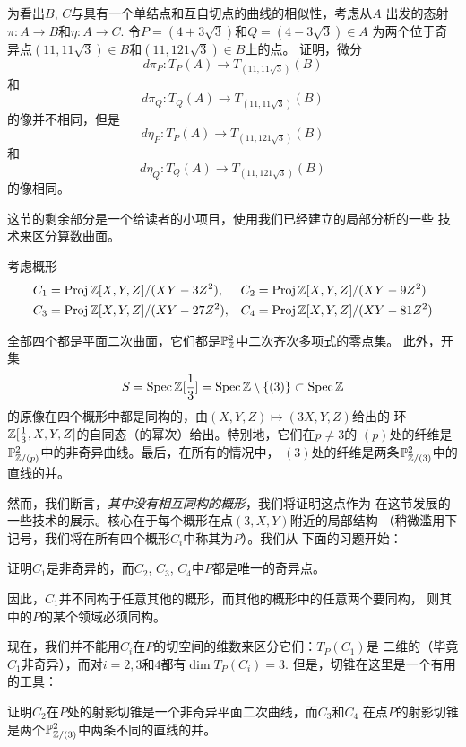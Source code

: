 \begin{exe}\label{exe:4.53}
为看出$B$, $C$与具有一个单结点和互自切点的曲线的相似性，考虑从$A$
出发的态射$\pi:A\to B$和$\eta:A\to C$. 令$P=(4+3\sqrt 3)$和$Q=(4-3\sqrt 3)\in A$
为两个位于奇异点$(11,11\sqrt 3)\in B$和$(11,121\sqrt 3)\in B$上的点。
证明，微分
\[
	d\pi_P:T_P(A)\longrightarrow T_{(11,11\sqrt 3)}(B)
\]
和
\[
	d\pi_Q:T_Q(A)\longrightarrow T_{(11,11\sqrt 3)}(B)
\]
的像并不相同，但是
\[
	d\eta_P:T_P(A)\longrightarrow T_{(11,121\sqrt 3)}(B)
\]
和
\[
	d\eta_Q:T_Q(A)\longrightarrow T_{(11,121\sqrt 3)}(B)
\]
的像相同。
\end{exe}


这节的剩余部分是一个给读者的小项目，使用我们已经建立的局部分析的一些
技术来区分算数曲面。

\begin{exa}\label{exa:4.54}
考虑概形
\[
	\begin{aligned}
		&C_1=\operatorname{Proj} \mathbb{Z}[X,Y,Z]/(XY-3Z^2),&&C_2=\operatorname{Proj} \mathbb{Z}[X,Y,Z]/(XY-9Z^2)\\
		&C_3=\operatorname{Proj} \mathbb{Z}[X,Y,Z]/(XY-27Z^2),&&C_4=\operatorname{Proj} \mathbb{Z}[X,Y,Z]/(XY-81Z^2)
	\end{aligned}
\]

全部四个都是平面二次曲面，它们都是$\mathbb{P}_{\mathbb{Z}}^2$中二次齐次多项式的零点集。
此外，开集
\[
	S=\operatorname{Spec} \mathbb{Z}[\frac 13]=\operatorname{Spec} \mathbb{Z}\setminus\{(3)\}\subset \operatorname{Spec} \mathbb{Z}
\]
的原像在四个概形中都是同构的，由$(X,Y,Z)\mapsto (3X,Y,Z)$给出的
环$\mathbb{Z}[\frac 13,X,Y,Z]$的自同态（的幂次）给出。特别地，它们在$p\neq 3$的
$(p)$处的纤维是$\mathbb{P}_{\mathbb{Z}/(p)}^2$中的非奇异曲线。最后，在所有的情况中，
$(3)$处的纤维是两条$\mathbb{P}_{\mathbb{Z}/(3)}^2$中的直线的并。
\end{exa}

然而，我们断言，\emph{其中没有相互同构的概形}，我们将证明这点作为
在这节发展的一些技术的展示。核心在于每个概形在点$(3,X,Y)$附近的局部结构
（稍微滥用下记号，我们将在所有四个概形$C_i$中称其为$P$）。我们从
下面的习题开始：

\begin{exe}\label{exe:4.55}
证明$C_1$是非奇异的，而$C_2$, $C_3$, $C_4$中$P$都是唯一的奇异点。
\end{exe}

因此，$C_1$并不同构于任意其他的概形，而其他的概形中的任意两个要同构，
则其中的$P$的某个领域必须同构。

现在，我们并不能用$C_i$在$P$的切空间的维数来区分它们：$T_P(C_1)$是
二维的（毕竟$C_1$非奇异），而对$i=2,3$和$4$都有$\dim T_P(C_i)=3$.
但是，切锥在这里是一个有用的工具：

\begin{exe}\label{exe:4.56}
证明$C_2$在$P$处的射影切锥是一个非奇异平面二次曲线，而$C_3$和$C_4$
在点$P$的射影切锥是两个$\mathbb{P}_{\mathbb{Z}/(3)}^2$中两条不同的直线的并。
\end{exe}

